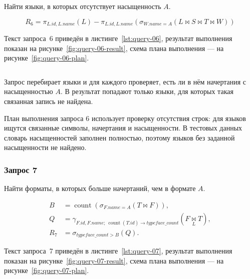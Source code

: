 Найти языки, в которых отсутствует насыщенность $A$.

\[
R_6 =
\pi_{L.id,L.name}(L) -
\pi_{L.id,L.name}\left(\sigma_{W.name=A}(L \bowtie S \bowtie T \bowtie W)\right)
\]

Текст запроса~6 приведён в листинге~\ref{lst:query-06}, результат выполнения показан на рисунке~\ref{fig:query-06-result}, схема плана выполнения --- на рисунке~\ref{fig:query-06-plan}.

\label{lst:query-06}
\vspace{-10pt}
\inputminted[linenos, numbersep=10pt, firstnumber=1, fontsize=\small]{sql}{../src/queries/query_06.sql}

Запрос перебирает языки и для каждого проверяет, есть ли в нём начертания с насыщенностью $A$. В результат попадают только языки, для которых такая связанная запись не найдена.


План выполнения запроса 6 использует проверку отсутствия строк: для языков ищутся связанные символы, начертания и насыщенности. В тестовых данных словарь насыщенностей заполнен полностью, поэтому языков без заданной насыщенности не найдено.


\subsubsection{Запрос 7}

Найти форматы, в которых больше начертаний, чем в формате $A$.

\[
\begin{aligned}
B &= \operatorname{count}\left(\sigma_{F.name=A}(T \bowtie F)\right),\\
Q &= \gamma_{F.id,F.name;\ \operatorname{count}(T.id) \rightarrow typeface\_count}
(F \underset{L}{\bowtie} T),\\
R_7 &= \sigma_{typeface\_count>B}(Q).
\end{aligned}
\]

Текст запроса~7 приведён в листинге~\ref{lst:query-07}, результат выполнения показан на рисунке~\ref{fig:query-07-result}, схема плана выполнения --- на рисунке~\ref{fig:query-07-plan}.

\label{lst:query-07}
\vspace{-10pt}
\inputminted[linenos, numbersep=10pt, firstnumber=1, fontsize=\small]{sql}{../src/queries/query_07.sql}

